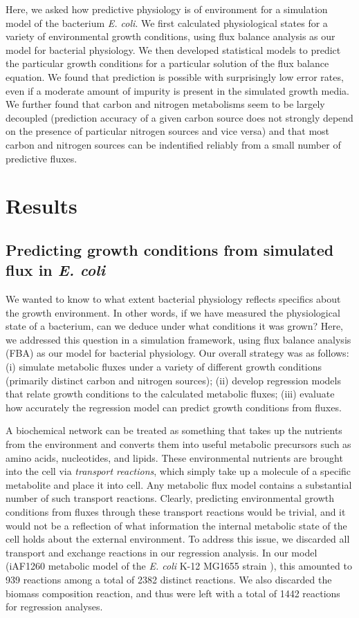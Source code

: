 \documentclass[12pt]{article}
\begin{document}
Here, we asked how predictive physiology is of environment for a simulation model of the bacterium \emph{E. coli}. We first calculated physiological states for a variety of environmental growth conditions, using flux balance analysis as our model for bacterial physiology. We then developed statistical models to predict the particular growth conditions for a particular solution of the flux balance equation. We found that prediction is possible with surprisingly low error rates, even if a moderate amount of impurity is present in the simulated growth media. We further found that carbon and nitrogen metabolisms seem to be largely decoupled (prediction accuracy of a given carbon source does not strongly depend on the presence of particular nitrogen sources and vice versa) and that most carbon and nitrogen sources can be indentified reliably from a small number of predictive fluxes.


\section*{Results}

\subsection*{Predicting growth conditions from simulated flux in \emph{E. coli}}

We wanted to know to what extent bacterial physiology reflects specifics about the growth environment. In other words, if we have measured the physiological state of a bacterium, can we deduce under what conditions it was grown? Here, we addressed this question in a simulation framework, using flux balance analysis (FBA) as our model for bacterial physiology. Our overall strategy was as follows: (i) simulate metabolic fluxes under a variety of different growth conditions (primarily distinct carbon and nitrogen sources); (ii) develop regression models that relate growth conditions to the calculated metabolic fluxes; (iii) evaluate how accurately the regression model can predict growth conditions from fluxes.

A biochemical network can be treated as something that takes up the nutrients from the environment and converts them into useful metabolic precursors such as amino acids, nucleotides, and lipids. These environmental nutrients are brought into the cell via \emph{transport reactions}, which simply take up a molecule of a specific metabolite and place it into cell. Any metabolic flux model contains a substantial number of such transport reactions. Clearly, predicting environmental growth conditions from fluxes through these transport reactions would be trivial, and it would not be a reflection of what information the internal metabolic state of the cell holds about the external environment. To address this issue, we discarded all transport and exchange reactions in our regression analysis. In our model (iAF1260 metabolic model of the \emph{E. coli} K-12 MG1655 strain \cite{Schellenbergeretal2010}), this amounted to 939 reactions among a total of 2382 distinct reactions. We also discarded the biomass composition reaction, and thus were left with a total of 1442 reactions for regression analyses.
\end{document}
